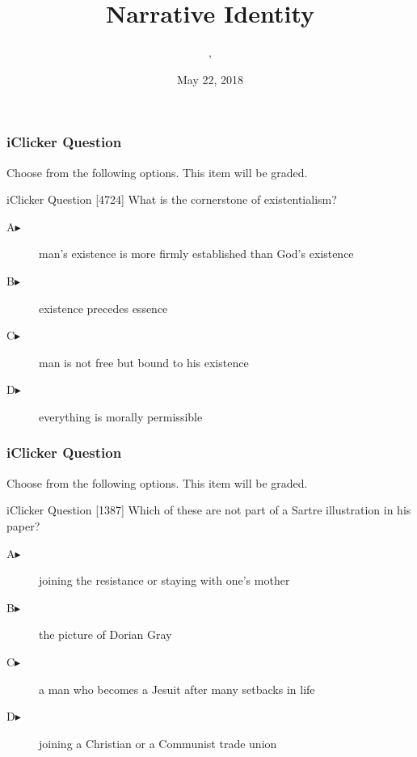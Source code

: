 \documentclass[xcolor=dvipsnames]{beamer}
\title{Narrative Identity}
\subtitle{{\CourseNumber}, {\CourseInst}}
\author{\CourseName}
\date{May 22, 2018}
\begin{document}
\begin{frame}
  \titlepage
\end{frame}

\begin{frame}
  \frametitle{iClicker Question}
Choose from the following options. This item will be graded.
\begin{block}{iClicker Question}
[4724] What is the cornerstone of existentialism?
\end{block}
\begin{description}
\item[A\hspace{.2in}$\blacktriangleright$] man's existence is more firmly established than God's existence
\item[B\hspace{.2in}$\blacktriangleright$] existence precedes essence
\item[C\hspace{.2in}$\blacktriangleright$] man is not free but bound to his existence
\item[D\hspace{.2in}$\blacktriangleright$] everything is morally permissible
\end{description}
\end{frame}

\begin{frame}
  \frametitle{iClicker Question}
Choose from the following options. This item will be graded.
\begin{block}{iClicker Question}
[1387] Which of these are not part of a Sartre illustration in his paper?
\end{block}
\begin{description}
\item[A\hspace{.2in}$\blacktriangleright$] joining the resistance or staying with one's mother
\item[B\hspace{.2in}$\blacktriangleright$] the picture of Dorian Gray
\item[C\hspace{.2in}$\blacktriangleright$] a man who becomes a Jesuit after many setbacks in life
\item[D\hspace{.2in}$\blacktriangleright$] joining a Christian or a Communist trade union
\end{description}
\end{frame}
\end{document}
